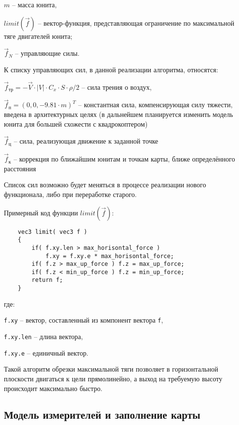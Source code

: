 $m$ -- масса юнита,

$limit \left( \vec f \right)$ -- вектор-функция, представляющая ограничение
по максимальной тяге двигателей юнита;

$\vec f_N$ -- управляющие силы.

К списку управляющих сил, в данной реализации алгоритма, относятся: 
\vspace{-0.5em}
\begin{mintemize}
    \item $\vec f_{\text{тр}} = -\vec V \cdot |V| \cdot C_x \cdot S \cdot \rho / 2$ -- сила трения о воздух,

    \item $\vec f_{\text{п}} = (0,0,-9.81 \cdot m)^T$ -- константная сила, компенсирующая силу тяжести,
        введена в архитектурных целях (в дальнейшем планируется изменить модель юнита
        для большей схожести с квадрокоптером)

    \item $\vec f_{\text{ц}}$ -- сила, реализующая движение к заданной точке
    \item $\vec f_{\text{к}}$ -- коррекция по ближайшим юнитам и точкам карты, ближе определённого расстояния
\end{mintemize}

Список сил возможно будет меняться в процессе реализации нового функционала, либо при переработке старого.

\newpage
Примерный код функции $limit \left( \vec f \right)$:

\begin{verbatim}
    vec3 limit( vec3 f )
    {
        if( f.xy.len > max_horisontal_force )
            f.xy = f.xy.e * max_horisontal_force;
        if( f.z > max_up_force ) f.z = max_up_force;
        if( f.z < min_up_force ) f.z = min_up_force;
        return f;
    }
\end{verbatim}

где:

\verb|f.xy| -- вектор, составленный из компонент вектора \verb|f|,

\verb|f.xy.len| -- длина вектора,

\verb|f.xy.e| -- единичный вектор.

Такой алгоритм обрезки максимальной тяги позволяет в горизонтальной плоскости двигаться к цели прямолинейно,
а выход на требуемую высоту происходит максимально быстро.

\newpage
\subsection{Модель измерителей и заполнение карты}

